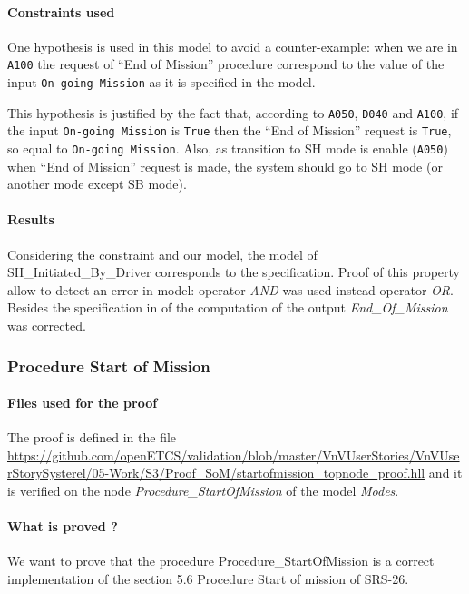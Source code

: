 \paragraph{Constraints used}
One hypothesis is used in this model to avoid a counter-example: when we are in \texttt{A100} the request of ``End of
Mission'' procedure correspond to the value of the input
\texttt{On-going Mission} as it is specified in the \SCADE{} model.

This hypothesis is justified by the fact that, according to
\texttt{A050}, \texttt{D040} and \texttt{A100}, if the input
\texttt{On-going Mission} is \texttt{True} then the ``End of Mission''
request is \texttt{True}, so equal to \texttt{On-going Mission}. Also,
as transition to SH mode is enable (\texttt{A050}) when ``End of
Mission'' request is made, the system should go to SH mode (or another
mode except SB mode). 

\paragraph{Results}
Considering the constraint and our model, the \SCADE{} model of
SH\_Initiated\_By\_Driver corresponds to the specification. Proof of this property allow to detect an error in \SCADE{} model: operator \emph{AND} was used instead operator \emph{OR}.
Besides the specification in \SCADE{}  of the computation of the output \emph{End\_Of\_Mission} was corrected.

\subsubsection{Procedure Start of Mission}

\paragraph{Files used for the proof}
The proof is defined in the file \url{https://github.com/openETCS/validation/blob/master/VnVUserStories/VnVUserStorySysterel/05-Work/S3/Proof_SoM/startofmission_topnode_proof.hll} and it is verified on the node \emph{Procedure\_StartOfMission} of the \SCADE{} model \emph{Modes}.


\paragraph{What is proved ?}
We want to prove that the procedure Procedure\_StartOfMission is a
correct implementation of the section 5.6 Procedure Start of mission of SRS-26.


